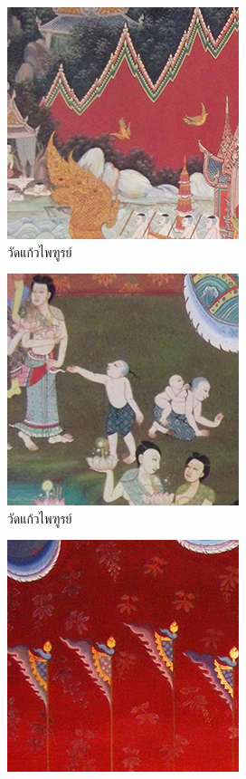 \begin{figure}[H]
    \centering
    \begin{subfigure}{\ResultSubFigureWidth \linewidth}
        \centering
        \includegraphics[width=\ResultSubFigurePadding \linewidth]{image/thaiart/case01-original.png}
        \caption{วัดแก้วไพฑูรย์}
        \label{image:thaiart_case01_original}
    \end{subfigure}
    \begin{subfigure}{\ResultSubFigureWidth \linewidth}
        \centering
        \includegraphics[width=\ResultSubFigurePadding \linewidth]{image/thaiart/case02-original.png}
        \caption{วัดแก้วไพฑูรย์}
        \label{image:thaiart_case02_original}
    \end{subfigure}
    \begin{subfigure}{\ResultSubFigureWidth \linewidth}
        \centering
        \includegraphics[width=\ResultSubFigurePadding \linewidth]{image/thaiart/case03-original.png}

\end{subfigure}
\end{figure}
